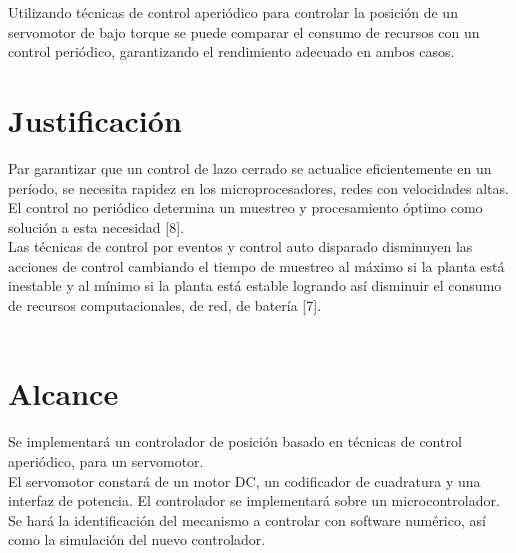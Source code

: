 Utilizando técnicas de control aperiódico para controlar la posición de un servomotor de bajo torque se puede comparar el consumo de recursos con un control periódico, garantizando el rendimiento adecuado en ambos casos.\\ 



\section{Justificaci\'on}
 Par garantizar que un control de lazo cerrado se actualice eficientemente en un período, se necesita rapidez en los microprocesadores, redes con velocidades altas. El control no periódico determina un muestreo y procesamiento óptimo como solución a esta necesidad [8].\\ 

Las técnicas de control por eventos y control auto disparado disminuyen las acciones de control cambiando el tiempo de muestreo al máximo si la planta está inestable y al mínimo si la planta está estable logrando así disminuir el consumo de recursos computacionales, de red, de batería [7].\\\ 


\section{Alcance}
Se implementará un controlador de posición basado en técnicas de control aperiódico, para un servomotor.\\

El servomotor constará de un motor DC, un codificador de cuadratura y una interfaz de potencia. El controlador se implementará sobre un microcontrolador.\\

Se hará la identificación del mecanismo a controlar con software numérico, así como la simulación del nuevo controlador.\\ 

